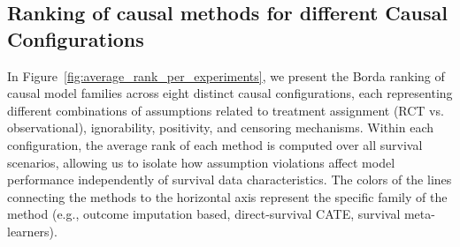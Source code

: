 \documentclass{article} %
\begin{document}
\clearpage

\subsection{Ranking of causal methods for different Causal Configurations}
\label{app:more-avg-rank}

In Figure~\ref{fig:average_rank_per_experiments}, we present the Borda ranking of causal model families across eight distinct causal configurations, each representing different combinations of assumptions related to treatment assignment (RCT vs. observational), ignorability, positivity, and censoring mechanisms. Within each configuration, the average rank of each method is computed over all survival scenarios, allowing us to isolate how assumption violations affect model performance independently of survival data characteristics. The colors of the lines connecting the methods to the horizontal axis represent the specific family of the method (e.g., outcome imputation based, direct-survival CATE, survival meta-learners).
\end{document}
